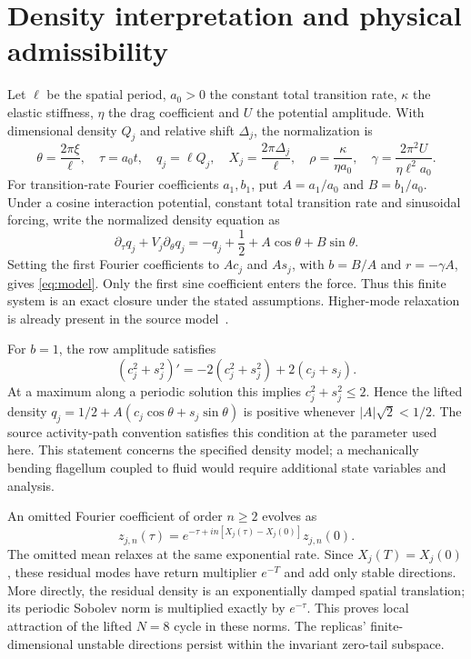 \documentclass[11pt]{article}
\begin{document}
\section{Density interpretation and physical admissibility}
Let $\ell$ be the spatial period, $a_0>0$ the constant total transition
rate, $\kappa$ the elastic stiffness, $\eta$ the drag coefficient and
$U$ the potential amplitude. With dimensional density $Q_j$ and relative
shift $\Delta_j$, the normalization is
\[
 \theta=\frac{2\pi\xi}{\ell},\quad \tau=a_0t,\quad
 q_j=\ell Q_j,\quad X_j=\frac{2\pi\Delta_j}{\ell},\quad
 \rho=\frac{\kappa}{\eta a_0},\quad
 \gamma=\frac{2\pi^2U}{\eta\ell^2a_0}.
\]
For transition-rate Fourier coefficients $a_1,b_1$, put
$A=a_1/a_0$ and $B=b_1/a_0$.
Under a cosine interaction potential, constant total transition rate and
sinusoidal forcing, write the normalized density equation as
\begin{equation}
 \partial_\tau q_j+V_j\partial_\theta q_j
 =-q_j+\frac12+A\cos\theta+B\sin\theta.
\end{equation}
Setting the first Fourier coefficients to $Ac_j$ and $As_j$, with
$b=B/A$ and $r=-\gamma A$, gives \eqref{eq:model}. Only the first sine
coefficient enters the force. Thus this finite system is an exact closure
under the stated assumptions. Higher-mode relaxation is already present
in the source model~\cite{alouges}.

For $b=1$, the row amplitude satisfies
\[
 (c_j^2+s_j^2)'=-2(c_j^2+s_j^2)+2(c_j+s_j).
\]
At a maximum along a periodic solution this implies
$c_j^2+s_j^2\leq2$. Hence the lifted density
$q_j=1/2+A(c_j\cos\theta+s_j\sin\theta)$ is positive whenever
$|A|\sqrt2<1/2$. The source activity-path convention satisfies this
condition at the parameter used here. This statement concerns the
specified density model; a mechanically bending flagellum coupled to
fluid would require additional state variables and analysis.

An omitted Fourier coefficient of order $n\geq2$ evolves as
\[
 z_{j,n}(\tau)=
 e^{-\tau+in[X_j(\tau)-X_j(0)]}z_{j,n}(0).
\]
The omitted mean relaxes at the same exponential rate. Since
$X_j(T)=X_j(0)$, these residual modes have return multiplier $e^{-T}$
and add only stable directions. More directly, the residual density is
an exponentially damped spatial translation; its periodic Sobolev norm
is multiplied exactly by $e^{-\tau}$. This proves local attraction of the
lifted $N=8$ cycle in these norms. The replicas' finite-dimensional
unstable directions persist within the invariant zero-tail subspace.
\end{document}
